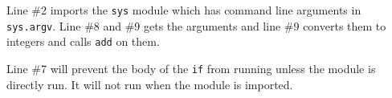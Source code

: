 Line \#2 imports the \texttt{sys} module which has command line
arguments in \texttt{sys.argv}. Line \#8 and \#9 gets the arguments
and line \#9 converts them to integers and calls \texttt{add} on them.

Line \#7 will prevent the body of the \texttt{if} from running unless
the module is directly run. It will not run when the module is imported.











